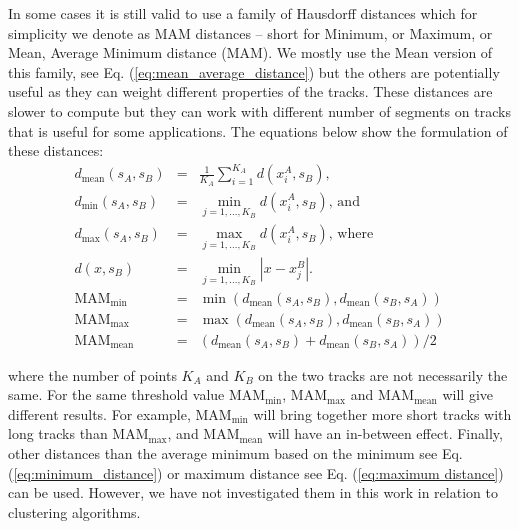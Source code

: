 \documentclass[preprint,authoryear,a4paper,10pt,onecolumn]{elsarticle}
\begin{document}
In some cases it is still valid to use a family of Hausdorff distances
which for simplicity we denote as MAM distances -- short for Minimum,
or Maximum, or Mean, Average Minimum distance (MAM). We mostly use
the Mean version of this family, see Eq. (\ref{eq:mean_average_distance})
but the others are potentially useful as they can weight different
properties of the tracks. These distances are slower to compute but
they can work with different number of segments on tracks that is
useful for some applications. The equations below show the formulation
of these distances:\begin{eqnarray}
d_{\textrm{mean}}(s_{A},s_{B}) & = & \frac{1}{K_{A}}\sum_{i=1}^{K_{A}}d(x_{i}^{A},s_{B}),\nonumber \\
d_{\textrm{min}}(s_{A},s_{B}) & = & \min_{j=1,...,K_{B}}d(x_{i}^{A},s_{B}),\,\textrm{and}\label{eq:minimum_distance}\\
d_{\textrm{max}}(s_{A},s_{B}) & = & \max_{j=1,...,K_{B}}d(x_{i}^{A},s_{B}),\,\textrm{where}\label{eq:maximum distance}\\
d(x,s_{B}) & = & \min_{j=1,...,K_{B}}|x-x_{j}^{B}|.\nonumber \\
\textrm{MAM}_{\textrm{min}} & = & \min(d_{\textrm{mean}}(s_{A},s_{B}),d_{\textrm{mean}}(s_{B},s_{A}))\label{eq:min_average_distance}\\
\textrm{MAM}_{\textrm{max}} & = & \max(d_{\textrm{mean}}(s_{A},s_{B}),d_{\textrm{mean}}(s_{B},s_{A}))\nonumber \\
\textrm{MAM}_{\textrm{mean}} & = & (d_{\textrm{mean}}(s_{A},s_{B})+d_{\textrm{mean}}(s_{B},s_{A}))/2\label{eq:mean_average_distance}\end{eqnarray}


\noindent
where the number of points $K_{A}$ and $K_{B}$ on the two tracks
are not necessarily the same. For the same threshold value $\textrm{MAM}_{\textrm{min}}$,
$\textrm{MAM}_{\textrm{max}}$ and $\textrm{MAM}_{\textrm{mean}}$
will give different results. For example, $\textrm{MAM}_{\textrm{min}}$ will
bring together more short tracks with long tracks than $\textrm{MAM}_{\textrm{max}}$,
and 
$\textrm{MAM}_{\textrm{mean}}$ 
will have an in-between effect. Finally, other distances than the average
minimum based on the minimum see Eq. (\ref{eq:minimum_distance})
or maximum distance see Eq. (\ref{eq:maximum distance}) can be used.
However, we have not investigated them in this work in relation to
clustering algorithms.
\end{document}
